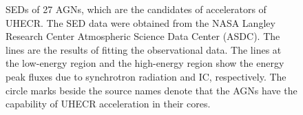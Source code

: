 \documentclass{aastex6}
\begin{document}
\begin{figure}
\caption{SEDs of 27 AGNs, which are the candidates of accelerators of UHECR. The SED data were obtained from the NASA Langley Research Center Atmospheric Science Data Center (ASDC). The lines are the results of fitting the observational data. The lines at the low-energy region and the high-energy region show the energy peak fluxes due to synchrotron radiation and IC, respectively. The circle marks beside the source names denote that the AGNs have the capability of UHECR acceleration in their cores.
\label{fig:SED}}
\end{figure}
\end{document}

